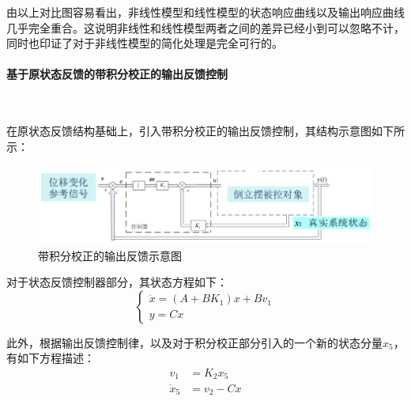 \documentclass[UTF8]{article}
\begin{document}
由以上对比图容易看出，非线性模型和线性模型的状态响应曲线以及输出响应曲线几乎完全重合。这说明非线性和线性模型两者之间的差异已经小到可以忽略不计，同时也印证了对于非线性模型的简化处理是完全可行的。

\paragraph{基于原状态反馈的带积分校正的输出反馈控制}~{}


在原状态反馈结构基础上，引入带积分校正的输出反馈控制，其结构示意图如下所示：
\begin{figure}[H]
    \centering %
    \includegraphics[width=.6\textwidth]{figure/倒立摆-带积分校正输出反馈.png}
    \caption{带积分校正的输出反馈示意图} %
\end{figure}

对于状态反馈控制器部分，其状态方程如下：
\begin{equation*}
	\begin{cases}
		\dot{x} = (A + BK_1)x + Bv_1 \\
		y = Cx
	\end{cases}
\end{equation*}

此外，根据输出反馈控制律，以及对于积分校正部分引入的一个新的状态分量$x_5$，有如下方程描述：
\begin{align*}
	v_1 &= K_2x_5 \\
	\dot{x}_5 &= v_2 - Cx
\end{align*}
\end{document}
